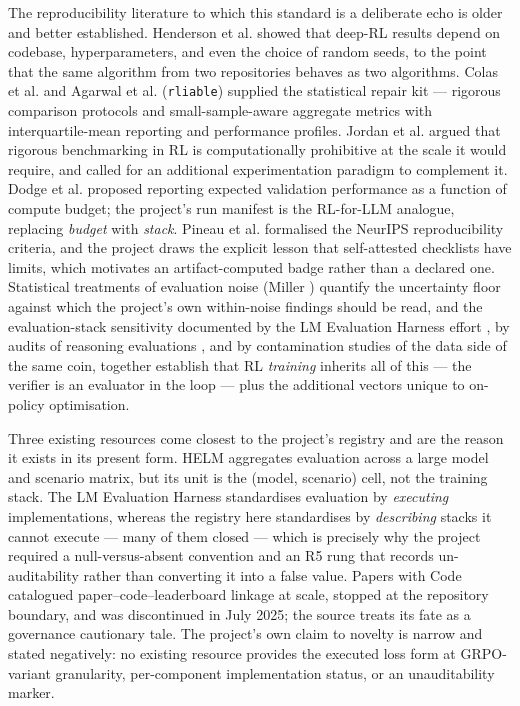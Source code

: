 \documentclass[12pt,a4paper]{report}
\begin{document}
The reproducibility literature to which this standard is a deliberate
echo is older and better established. Henderson et al.
\citep{henderson2018deep} showed that deep-RL results depend on
codebase, hyperparameters, and even the choice of random seeds, to the
point that the same algorithm from two repositories behaves as two
algorithms. Colas et al. \citep{colas2019hitchhiker} and Agarwal et al.
\citep{agarwal2021deep} (\texttt{rliable}) supplied the statistical
repair kit --- rigorous comparison protocols and small-sample-aware
aggregate metrics with interquartile-mean reporting and performance
profiles. Jordan et al. \citep{jordan2024benchmarking} argued that
rigorous benchmarking in RL is computationally prohibitive at the scale
it would require, and called for an additional experimentation paradigm
to complement it. Dodge et al. \citep{dodge2019show} proposed reporting
expected validation performance as a function of compute budget; the
project's run manifest is the RL-for-LLM analogue, replacing
\emph{budget} with \emph{stack}. Pineau et al.
\citep{pineau2021reproducibility} formalised the NeurIPS reproducibility
criteria, and the project draws the explicit lesson that self-attested
checklists have limits, which motivates an artifact-computed badge
rather than a declared one. Statistical treatments of evaluation noise
(Miller \citep{miller2024errorbars}) quantify the uncertainty floor
against which the project's own within-noise findings should be read,
and the evaluation-stack sensitivity documented by the LM Evaluation
Harness effort \citep{biderman2024lmeval}, by audits of reasoning
evaluations \citep{hochlehnert2025sober}, and by contamination studies
of the data side of the same coin, together establish that RL
\emph{training} inherits all of this --- the verifier is an evaluator in
the loop --- plus the additional vectors unique to on-policy
optimisation.

Three existing resources come closest to the project's registry and are
the reason it exists in its present form. HELM \citep{liang2022helm}
aggregates evaluation across a large model and scenario matrix, but its
unit is the (model, scenario) cell, not the training stack. The LM
Evaluation Harness \citep{biderman2024lmeval} standardises evaluation by
\emph{executing} implementations, whereas the registry here standardises
by \emph{describing} stacks it cannot execute --- many of them closed
--- which is precisely why the project required a null-versus-absent
convention and an R5 rung that records un-auditability rather than
converting it into a false value. Papers with Code catalogued
paper--code--leaderboard linkage at scale, stopped at the repository
boundary, and was discontinued in July 2025; the source treats its fate
as a governance cautionary tale. The project's own claim to novelty is
narrow and stated negatively: no existing resource provides the executed
loss form at GRPO-variant granularity, per-component implementation
status, or an unauditability marker.
\end{document}
